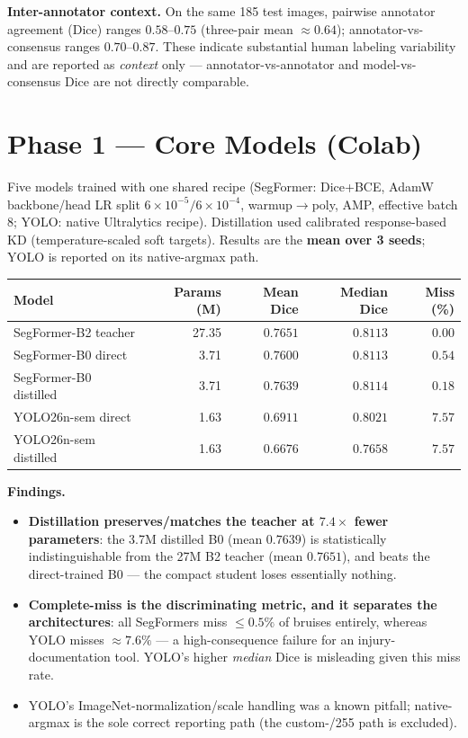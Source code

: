\documentclass[11pt]{article}
\begin{document}
\textbf{Inter-annotator context.} On the same 185 test images, pairwise annotator agreement (Dice)
ranges $0.58$--$0.75$ (three-pair mean $\approx0.64$); annotator-vs-consensus ranges $0.70$--$0.87$.
These indicate substantial human labeling variability and are reported as \emph{context} only ---
annotator-vs-annotator and model-vs-consensus Dice are not directly comparable.

\section{Phase 1 --- Core Models (Colab)}

Five models trained with one shared recipe (SegFormer: Dice+BCE, AdamW backbone/head LR split
$6\!\times\!10^{-5}/6\!\times\!10^{-4}$, warmup$\to$poly, AMP, effective batch 8; YOLO: native
Ultralytics recipe). Distillation used calibrated response-based KD (temperature-scaled soft
targets). Results are the \textbf{mean over 3 seeds}; YOLO is reported on its native-argmax path.

\begin{center}\small
\begin{tabular}{l R R R R}
\toprule
Model & Params (M) & Mean Dice & Median Dice & Miss (\%) \\
\midrule
SegFormer-B2 teacher       & 27.35 & $0.7651$ & $0.8113$ & $0.00$ \\
SegFormer-B0 direct        & 3.71  & $0.7600$ & $0.8113$ & $0.54$ \\
SegFormer-B0 distilled     & 3.71  & $0.7639$ & $0.8114$ & $0.18$ \\
YOLO26n-sem direct         & 1.63  & $0.6911$ & $0.8021$ & $7.57$ \\
YOLO26n-sem distilled      & 1.63  & $0.6676$ & $0.7658$ & $7.57$ \\
\bottomrule
\end{tabular}
\end{center}

\noindent\textbf{Findings.}
\begin{itemize}[leftmargin=1.4em,itemsep=1pt]
  \item \textbf{Distillation preserves/matches the teacher at $7.4\times$ fewer parameters}: the
  3.7M distilled B0 (mean $0.7639$) is statistically indistinguishable from the 27M B2 teacher
  (mean $0.7651$), and beats the direct-trained B0 --- the compact student loses essentially nothing.
  \item \textbf{Complete-miss is the discriminating metric, and it separates the architectures}:
  all SegFormers miss $\le0.5\%$ of bruises entirely, whereas YOLO misses $\approx7.6\%$ --- a
  high-consequence failure for an injury-documentation tool. YOLO's higher \emph{median} Dice is
  misleading given this miss rate.
  \item YOLO's ImageNet-normalization/scale handling was a known pitfall; native-argmax is the sole
  correct reporting path (the custom-/255 path is excluded).
\end{itemize}
\end{document}
